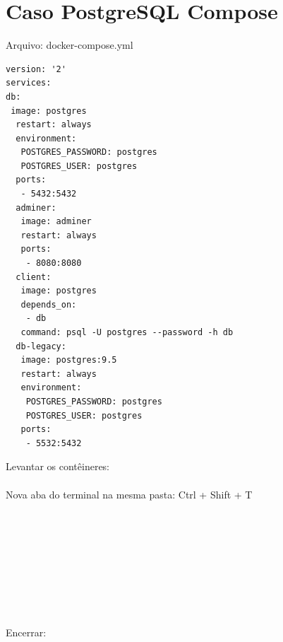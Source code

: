 \documentclass[a4paper,11pt]{article}
\begin{document}
\section{Caso PostgreSQL Compose}
Arquivo: docker-compose.yml
\begin{lstlisting}
version: '2'
services:
db:
 image: postgres
  restart: always
  environment:
   POSTGRES_PASSWORD: postgres
   POSTGRES_USER: postgres
  ports:
   - 5432:5432
  adminer:
   image: adminer
   restart: always
   ports:
    - 8080:8080
  client:
   image: postgres
   depends_on:
    - db
   command: psql -U postgres --password -h db
  db-legacy:
   image: postgres:9.5
   restart: always
   environment:
    POSTGRES_PASSWORD: postgres
    POSTGRES_USER: postgres
   ports:
    - 5532:5432
\end{lstlisting}
Levantar os contêineres: \\
 \\[2mm]
Nova aba do terminal na mesma pasta: Ctrl + Shift + T
 \\
 \\
 \\
 \\
 \\
 \\
 \\
 \\
 \\
 \\[2mm]
Encerrar: \\
\end{document}
